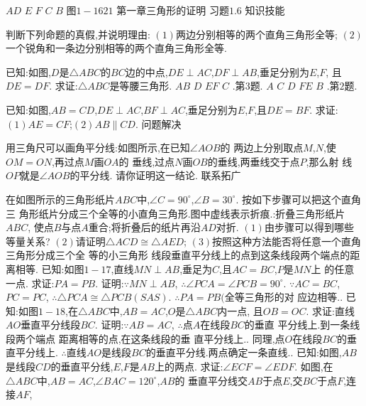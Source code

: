\documentclass[cn,blue,12pt]{elegantbook}
\begin{document}
\begin{liti}[resume]
\(A D\)
\(E\)
\(F\)
\(C\)
\(B\)
图\( 1-1621\)
第一章\(  \)三角形的证明
习题\( 1.6\)
知识技能
\item 判断下列命题的真假,并说明理由:
\(( 1) \)两边分别相等的两个直角三角形全等;
\(( 2) \)一个锐角和一条边分别相等的两个直角三角形全等. 
\item 已知:如图,\( D \)是\( \triangle ABC \)的\( BC \)边的中点,\( DE \perp AC\),\( DF \perp AB\),垂足分别为\( E\),\( F\),
且\( DE = DF\). 求证:\( \triangle ABC \)是等腰三角形. 
\(A B\)
\(D\)
\(E F\)
\(C\)
.第\( 3 \)题.
\(A\)
\(C\)
\(D\)
\(F E\)
\(B\)
.第\( 2 \)题.
\item 已知:如图,\( AB = CD\),\( DE \perp AC\),\( BF \perp AC\),垂足分别为\( E\),\( F\),且\( DE = BF\). 求证:
\(( 1) AE = CF\);\( ( 2) AB \parallel CD\). 
问题解决
\item 用三角尺可以画角平分线:如图所示,在已知\( \angle  AOB \)的
两边上分别取点\( M\),\( N\),使\( OM = ON\),再过点\( M \)画\( OA \)的
垂线,过点\( N \)画\( OB \)的垂线,两垂线交于点\( P\),那么射
线\( OP \)就是\( \angle  AOB \)的平分线. 请你证明这一结论. 
联系拓广
\item 在如图所示的三角形纸片\( ABC \)中,\( \angle  C = 90 ^\circ \),\( \angle  B = 30 ^\circ \). 按如下步骤可以把这个直角三
角形纸片分成三个全等的小直角三角形.图中虚线表示折痕.:折叠三角形纸片\( ABC\),
使点\( B \)与点\( A \)重合;将折叠后的纸片再沿\( AD \)对折. 
\(( 1) \)由步骤可以得到哪些等量关系?
\(( 2) \)请证明\( \triangle ACD \cong   \triangle AED\);
\(( 3) \)按照这种方法能否将任意一个直角三角形分成三个全
等的小三角形
线段垂直平分线上的点到这条线段两个端点的距离相等. 
已知:如图\( 1-17\),直线\( MN \perp AB\),垂足为\( C\),且\( AC = BC\),\( P \)是\( MN \)上
的任意一点. 
求证:\( PA = PB\). 
证明:\( \because MN \perp AB\),
\( \therefore \angle  PCA =  \angle  PCB = 90 ^\circ \). 
\( \because AC = BC\),\( PC = PC\),
\( \therefore \triangle PCA \cong  \triangle PCB( SAS) \). 
\( \therefore PA = PB( \)全等三角形的对
应边相等.. 
已知:如图\( 1-18\),在\( \triangle ABC \)中,\( AB = AC\),\( O \)是\( \triangle ABC \)内一点,
且\( OB = OC\). 
求证:直线\( AO \)垂直平分线段\( BC\). 
证明:\( \because AB = AC\),
\( \therefore \)点\( A \)在线段\( BC \)的垂直
平分线上.到一条线段两个端点
距离相等的点,在这条线段的垂
直平分线上.. 
同理,点\( O \)在线段\( BC \)的垂
直平分线上. 
\( \therefore \)直线\( AO \)是线段\( BC \)的垂直平分线.两点确定一条直线.. 
已知:如图,\( AB \)是线段\( CD \)的垂直平分线,\( E\),\( F \)是\( AB \)上的两点. 
求证:\( \angle  ECF = \angle  EDF\). 
如图,在\( \triangle ABC \)中,\( AB = AC\),\( \angle  BAC = 120 ^\circ \),\( AB \)的
垂直平分线交\( AB \)于点\( E\),交\( BC \)于点\( F\),连接\( AF\),

\end{liti}
\end{document}
